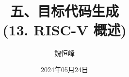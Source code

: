 \documentclass[]{beamer}
\title[目标代码生成]{五、目标代码生成 \\ (13. RISC-V 概述)}
\author[魏恒峰]{\large 魏恒峰}
\institute{hfwei@nju.edu.cn}
\date{2024年05月24日}
\begin{document}
\maketitle



\thankyou{}

\end{document}
